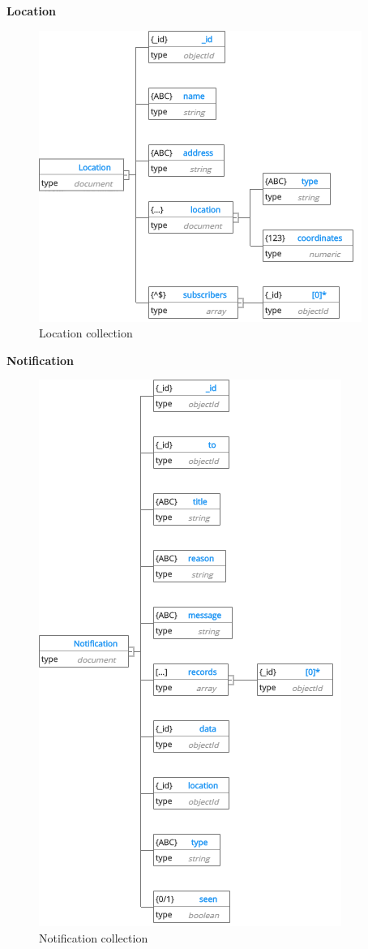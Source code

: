 \cleardoublepage
\textbf{Location}
\begin{center}
    \begin{figure}[H]
    \centering
    \includegraphics[width=1\columnwidth]{images/chap4/Location.png}
    \caption{Location collection}
    \end{figure}
\end{center}
\cleardoublepage
\textbf{Notification}
\begin{center}
    \begin{figure}[H]
    \centering
    \includegraphics[width=0.7\columnwidth]{images/chap4/Notification.png}
    \caption{Notification collection}
    \end{figure}
\end{center}
